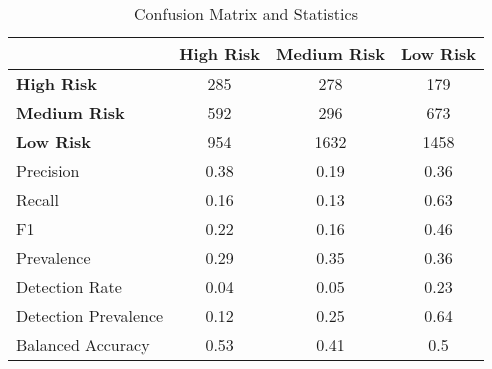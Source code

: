 \begin{table}[!htbp]
    \small
    \centering
    \caption{Confusion Matrix and Statistics}
    \label{tab:confusion}
    \begin{tabular}{lccc}
        \toprule
        & \textbf{High Risk} & \textbf{Medium Risk} & \textbf{Low Risk} \\
        \midrule
        \textbf{High Risk} & 285 & 278 & 179 \\
        \textbf{Medium Risk} & 592 & 296 & 673 \\
        \textbf{Low Risk} & 954 & 1632 & 1458 \\
        \bottomrule
        \midrule
        Precision & 0.38 & 0.19 & 0.36 \\
        Recall & 0.16 & 0.13 & 0.63 \\
        F1 & 0.22 & 0.16 & 0.46 \\
        Prevalence & 0.29 & 0.35 & 0.36 \\
        Detection Rate & 0.04 & 0.05 & 0.23 \\
        Detection Prevalence & 0.12 & 0.25 & 0.64 \\
        Balanced Accuracy & 0.53 & 0.41 & 0.5 \\
        \bottomrule
    \end{tabular}
\end{table}